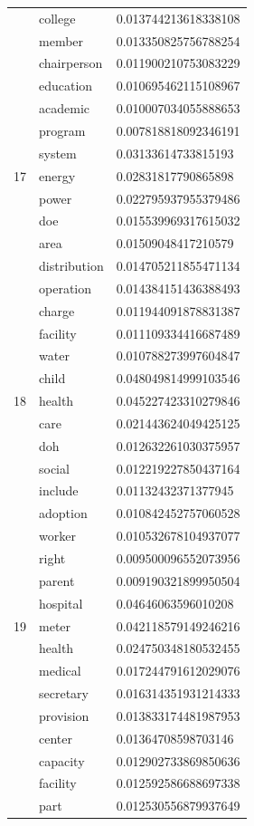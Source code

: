 \documentclass[conference]{IEEEtran}
\begin{document}
\begin{center}
\begin{longtable}{|l|l|l|}
& college & 0.013744213618338108 \\
& member & 0.013350825756788254 \\
& chairperson & 0.011900210753083229 \\
& education & 0.010695462115108967 \\
& academic & 0.010007034055888653 \\
& program & 0.007818818092346191 \\
\hline
\multirow{3}{4em}{17} & system & 0.03133614733815193 \\
& energy & 0.02831817790865898 \\
& power & 0.022795937955379486 \\
& doe & 0.015539969317615032 \\
& area & 0.01509048417210579 \\
& distribution & 0.014705211855471134 \\
& operation & 0.014384151436388493 \\
& charge & 0.011944091878831387 \\
& facility & 0.011109334416687489 \\
& water & 0.010788273997604847 \\
\hline
\multirow{3}{4em}{18} & child & 0.048049814999103546 \\
& health & 0.045227423310279846 \\
& care & 0.021443624049425125 \\
& doh & 0.012632261030375957 \\
& social & 0.012219227850437164 \\
& include & 0.01132432371377945 \\
& adoption & 0.010842452757060528 \\
& worker & 0.010532678104937077 \\
& right & 0.009500096552073956 \\
& parent & 0.009190321899950504 \\
\hline
\multirow{3}{4em}{19} & hospital & 0.04646063596010208 \\
& meter & 0.042118579149246216 \\
& health & 0.024750348180532455 \\
& medical & 0.017244791612029076 \\
& secretary & 0.016314351931214333 \\
& provision & 0.013833174481987953 \\
& center & 0.01364708598703146 \\
& capacity & 0.012902733869850636 \\
& facility & 0.012592586688697338 \\
& part & 0.012530556879937649 \\
\end{longtable}
\end{center}

\vspace{12pt}
\end{document}

